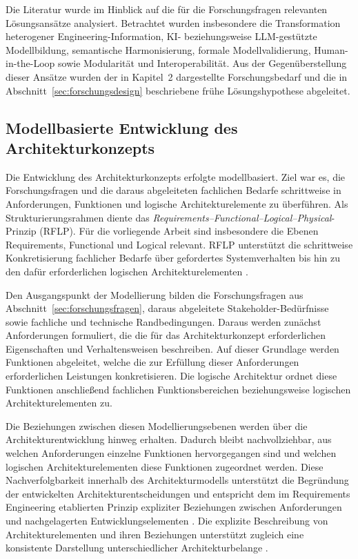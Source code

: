 Die Literatur wurde im Hinblick auf die für die Forschungsfragen relevanten
Lösungsansätze analysiert. Betrachtet wurden insbesondere die Transformation
heterogener Engineering-Information, KI- beziehungsweise LLM-gestützte
Modellbildung, semantische Harmonisierung, formale Modellvalidierung,
Human-in-the-Loop sowie Modularität und Interoperabilität. Aus der
Gegenüberstellung dieser Ansätze wurden der in Kapitel~2 dargestellte
Forschungsbedarf und die in Abschnitt~\ref{sec:forschungsdesign}
beschriebene frühe Lösungshypothese abgeleitet.

\subsection{Modellbasierte Entwicklung des Architekturkonzepts}
\label{sec:architekturmethodik}

Die Entwicklung des Architekturkonzepts erfolgte modellbasiert. Ziel war es,
die Forschungsfragen und die daraus abgeleiteten fachlichen Bedarfe
schrittweise in Anforderungen, Funktionen und logische Architekturelemente zu
überführen. Als Strukturierungsrahmen diente das
\emph{Requirements--Functional--Logical--Physical}-Prinzip (RFLP).
Für die vorliegende Arbeit sind insbesondere die Ebenen Requirements,
Functional und Logical relevant. RFLP unterstützt die schrittweise Konkretisierung fachlicher
Bedarfe über gefordertes Systemverhalten bis hin zu den dafür erforderlichen
logischen Architekturelementen \cite{LiLockettLawson2020}.

Den Ausgangspunkt der Modellierung bilden die Forschungsfragen aus
Abschnitt~\ref{sec:forschungsfragen}, daraus abgeleitete
Stakeholder-Bedürfnisse sowie fachliche und technische Randbedingungen.
Daraus werden zunächst Anforderungen formuliert, die die für das
Architekturkonzept erforderlichen Eigenschaften und Verhaltensweisen
beschreiben. Auf dieser Grundlage werden Funktionen abgeleitet, welche die zur
Erfüllung dieser Anforderungen erforderlichen Leistungen konkretisieren. Die
logische Architektur ordnet diese Funktionen anschließend fachlichen
Funktionsbereichen beziehungsweise logischen Architekturelementen zu.

Die Beziehungen zwischen diesen Modellierungsebenen werden über die
Architekturentwicklung hinweg erhalten. Dadurch bleibt nachvollziehbar, aus
welchen Anforderungen einzelne Funktionen hervorgegangen sind und welchen
logischen Architekturelementen diese Funktionen zugeordnet werden. Diese
Nachverfolgbarkeit innerhalb des Architekturmodells unterstützt die
Begründung der entwickelten Architekturentscheidungen und entspricht dem im
Requirements Engineering etablierten Prinzip expliziter Beziehungen zwischen
Anforderungen und nachgelagerten Entwicklungselementen
\cite{ISO29148}. Die explizite Beschreibung von Architekturelementen und ihren
Beziehungen unterstützt zugleich eine konsistente Darstellung
unterschiedlicher Architekturbelange \cite{ISO42010_2022}.

